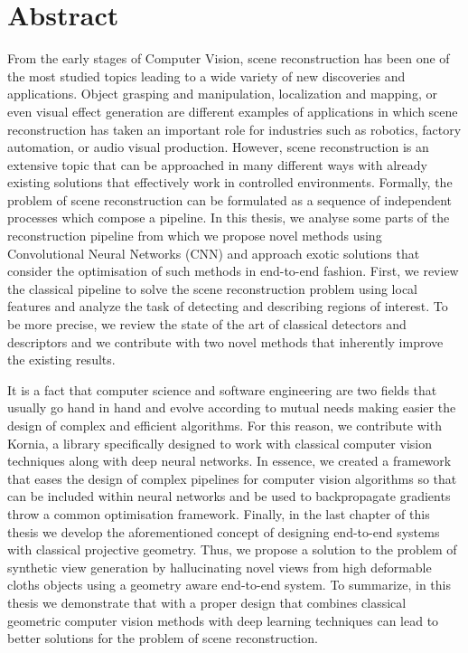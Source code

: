 


\chapter*{Abstract}

\vspace{-24mm}

From the early stages of Computer Vision, scene reconstruction has been one of the most studied topics leading to a wide variety of new discoveries and applications. Object grasping and manipulation, localization and mapping, or even visual effect generation are different examples of applications in which scene reconstruction has taken an important role for industries such as robotics, factory automation, or audio visual production. However, scene reconstruction is an extensive topic that can be approached in many different ways with already existing solutions that effectively work in controlled environments. Formally, the problem of scene reconstruction can be formulated as a sequence of independent processes which compose a pipeline. In this thesis, we analyse some parts of the reconstruction pipeline from which we propose novel methods using Convolutional Neural Networks (CNN) and approach exotic solutions that consider the optimisation of such methods in end-to-end fashion. First, we review the classical pipeline to solve the scene reconstruction problem using local features and analyze the task of detecting and describing regions of interest. To be more precise, we review the state of the art of classical detectors and descriptors and we contribute with two novel methods that inherently improve the existing results.

It is a fact that computer science and software engineering are two fields that usually go hand in hand and evolve according to mutual needs making easier the design of complex and efficient algorithms. For this reason, we contribute with Kornia, a library specifically designed to work with classical computer vision techniques along with deep neural networks. In essence, we created a framework that eases the design of complex pipelines for computer vision algorithms so that can be included within neural networks and be used to backpropagate gradients throw a common optimisation framework. Finally, in the last chapter of this thesis we develop the aforementioned concept of designing end-to-end systems with classical projective geometry. Thus, we propose a solution to the problem of synthetic view generation by hallucinating novel views from high deformable cloths objects using a geometry aware end-to-end system. To summarize, in this thesis we demonstrate that with a proper design that combines classical geometric computer vision methods with deep learning techniques can lead to better solutions for the problem of scene reconstruction.

